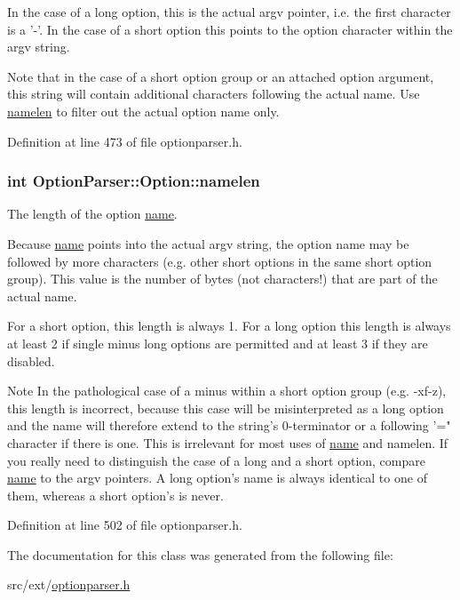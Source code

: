 In the case of a long option, this is the actual {\ttfamily argv} pointer, i.\-e. the first character is a '-\/'. In the case of a short option this points to the option character within the {\ttfamily argv} string.

Note that in the case of a short option group or an attached option argument, this string will contain additional characters following the actual name. Use \hyperlink{class_option_parser_1_1_option_a25a2b22da7c974be3bcda66f08d2f3f3}{namelen} to filter out the actual option name only. 

Definition at line 473 of file optionparser.\-h.

\hypertarget{class_option_parser_1_1_option_a25a2b22da7c974be3bcda66f08d2f3f3}{
\subsubsection[{namelen}]{\setlength{\rightskip}{0pt plus 5cm}int Option\-Parser\-::\-Option\-::namelen}}\label{class_option_parser_1_1_option_a25a2b22da7c974be3bcda66f08d2f3f3}


The length of the option \hyperlink{class_option_parser_1_1_option_abea386c9b8b1a810a2eb776d338fdfab}{name}. 

Because \hyperlink{class_option_parser_1_1_option_abea386c9b8b1a810a2eb776d338fdfab}{name} points into the actual {\ttfamily argv} string, the option name may be followed by more characters (e.\-g. other short options in the same short option group). This value is the number of bytes (not characters!) that are part of the actual name.

For a short option, this length is always 1. For a long option this length is always at least 2 if single minus long options are permitted and at least 3 if they are disabled.

\begin{DoxyNote}{Note}
In the pathological case of a minus within a short option group (e.\-g. {\ttfamily -\/xf-\/z}), this length is incorrect, because this case will be misinterpreted as a long option and the name will therefore extend to the string's 0-\/terminator or a following '=" character if there is one. This is irrelevant for most uses of \hyperlink{class_option_parser_1_1_option_abea386c9b8b1a810a2eb776d338fdfab}{name} and {\ttfamily namelen}. If you really need to distinguish the case of a long and a short option, compare \hyperlink{class_option_parser_1_1_option_abea386c9b8b1a810a2eb776d338fdfab}{name} to the {\ttfamily argv} pointers. A long option's {\ttfamily name} is always identical to one of them, whereas a short option's is never. 
\end{DoxyNote}


Definition at line 502 of file optionparser.\-h.



The documentation for this class was generated from the following file\-:\begin{DoxyCompactItemize}
\item 
src/ext/\hyperlink{optionparser_8h}{optionparser.\-h}\end{DoxyCompactItemize}
